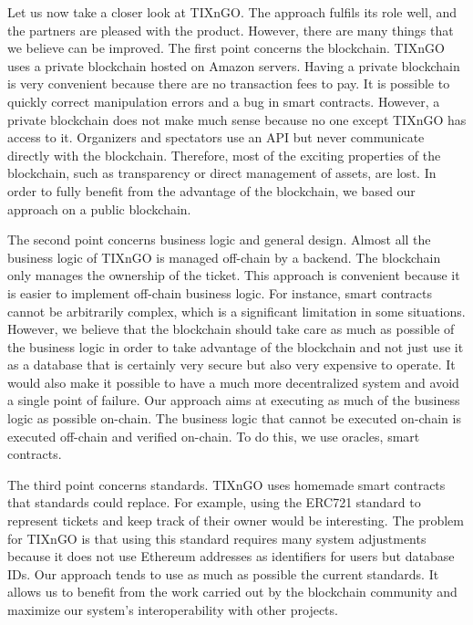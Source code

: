\documentclass[a4paper,11pt,oneside]{report}
\begin{document}
Let us now take a closer look at TIXnGO. The approach fulfils its role well, and the partners are pleased with the product. However, there are many things that we believe can be improved. The first point concerns the blockchain. TIXnGO uses a private blockchain hosted on Amazon servers. Having a private blockchain is very convenient because there are no transaction fees to pay. It is possible to quickly correct manipulation errors and a bug in smart contracts. However, a private blockchain does not make much sense because no one except TIXnGO has access to it. Organizers and spectators use an API but never communicate directly with the blockchain. Therefore, most of the exciting properties of the blockchain, such as transparency or direct management of assets, are lost. In order to fully benefit from the advantage of the blockchain, we based our approach on a public blockchain.

The second point concerns business logic and general design. Almost all the business logic of TIXnGO is managed off-chain by a backend. The blockchain only manages the ownership of the ticket. This approach is convenient because it is easier to implement off-chain business logic. For instance, smart contracts cannot be arbitrarily complex, which is a significant limitation in some situations. However, we believe that the blockchain should take care as much as possible of the business logic in order to take advantage of the blockchain and not just use it as a database that is certainly very secure but also very expensive to operate. It would also make it possible to have a much more decentralized system and avoid a single point of failure. Our approach aims at executing as much of the business logic as possible on-chain. The business logic that cannot be executed on-chain is executed off-chain and verified on-chain. To do this, we use oracles, smart contracts.

The third point concerns standards. TIXnGO uses homemade smart contracts that standards could replace. For example, using the ERC721 standard to represent tickets and keep track of their owner would be interesting. The problem for TIXnGO is that using this standard requires many system adjustments because it does not use Ethereum addresses as identifiers for users but database IDs. Our approach tends to use as much as possible the current standards. It allows us to benefit from the work carried out by the blockchain community and maximize our system's interoperability with other projects.
\end{document}
